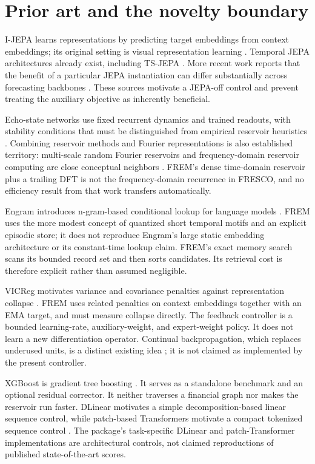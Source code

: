 \documentclass[11pt,a4paper]{article}
\begin{document}
\section{Prior art and the novelty boundary}

I-JEPA learns representations by predicting target embeddings from context embeddings; its original setting is visual representation learning \citep{assran2023}. Temporal JEPA architectures already exist, including TS-JEPA \citep{ennadir2025}. More recent work reports that the benefit of a particular JEPA instantiation can differ substantially across forecasting backbones \citep{feng2026}. These sources motivate a JEPA-off control and prevent treating the auxiliary objective as inherently beneficial.

Echo-state networks use fixed recurrent dynamics and trained readouts, with stability conditions that must be distinguished from empirical reservoir heuristics \citep{jaeger2001}. Combining reservoir methods and Fourier representations is also established territory: multi-scale random Fourier reservoirs and frequency-domain reservoir computing are close conceptual neighbors \citep{laha2025,fresco2026}. FREM's dense time-domain reservoir plus a trailing DFT is not the frequency-domain recurrence in FRESCO, and no efficiency result from that work transfers automatically.

Engram introduces n-gram-based conditional lookup for language models \citep{cheng2026}. FREM uses the more modest concept of quantized short temporal motifs and an explicit episodic store; it does not reproduce Engram's large static embedding architecture or its constant-time lookup claim. FREM's exact memory search scans its bounded record set and then sorts candidates. Its retrieval cost is therefore explicit rather than assumed negligible.

VICReg motivates variance and covariance penalties against representation collapse \citep{bardes2021}. FREM uses related penalties on context embeddings together with an EMA target, and must measure collapse directly. The feedback controller is a bounded learning-rate, auxiliary-weight, and expert-weight policy. It does not learn a new differentiation operator. Continual backpropagation, which replaces underused units, is a distinct existing idea \citep{dohare2023}; it is not claimed as implemented by the present controller.

XGBoost is gradient tree boosting \citep{chen2016}. It serves as a standalone benchmark and an optional residual corrector. It neither traverses a financial graph nor makes the reservoir run faster. DLinear motivates a simple decomposition-based linear sequence control, while patch-based Transformers motivate a compact tokenized sequence control \citep{zeng2022,nie2022}. The package's task-specific DLinear and patch-Transformer implementations are architectural controls, not claimed reproductions of published state-of-the-art scores.
\end{document}
